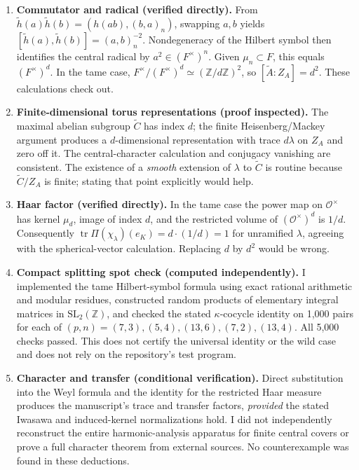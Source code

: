 \documentclass[12pt,letterpaper]{article}
\newcommand{\At}{\widetilde A}
\newcommand{\ZA}{Z_A}
\DeclareMathOperator{\tr}{tr}
\newcommand{\SL}{\mathrm{SL}}
\begin{document}
\begin{enumerate}[label=\textbf{C\arabic*.}]
\item \textbf{Commutator and radical (verified directly).} From $\widetilde h(a)\widetilde h(b)=(h(ab),(b,a)_n)$, swapping $a,b$ yields $[\widetilde h(a),\widetilde h(b)]=(a,b)_n^{-2}$. Nondegeneracy of the Hilbert symbol then identifies the central radical by $a^2\in(F^\times)^n$. Given $\mu_n\subset F$, this equals $(F^\times)^d$. In the tame case, $F^\times/(F^\times)^d\simeq(\mathbb Z/d\mathbb Z)^2$, so $[\At:\ZA]=d^2$. These calculations check out.
\item \textbf{Finite-dimensional torus representations (proof inspected).} The maximal abelian subgroup $\widetilde C$ has index $d$; the finite Heisenberg/Mackey argument produces a $d$-dimensional representation with trace $d\lambda$ on $\ZA$ and zero off it. The central-character calculation and conjugacy vanishing are consistent. The existence of a \emph{smooth} extension of $\lambda$ to $\widetilde C$ is routine because $\widetilde C/\ZA$ is finite; stating that point explicitly would help.
\item \textbf{Haar factor (verified directly).} In the tame case the power map on $\mathcal O^\times$ has kernel $\mu_d$, image of index $d$, and the restricted volume of $(\mathcal O^\times)^d$ is $1/d$. Consequently $\tr\Pi(\chi_\lambda)(e_K)=d\cdot(1/d)=1$ for unramified $\lambda$, agreeing with the spherical-vector calculation. Replacing $d$ by $d^2$ would be wrong.
\item \textbf{Compact splitting spot check (computed independently).} I implemented the tame Hilbert-symbol formula using exact rational arithmetic and modular residues, constructed random products of elementary integral matrices in $\SL_2(\mathbb Z)$, and checked the stated $\kappa$-cocycle identity on 1,000 pairs for each of $(p,n)=(7,3),(5,4),(13,6),(7,2),(13,4)$. All 5,000 checks passed. This does not certify the universal identity or the wild case and does not rely on the repository's test program.
\item \textbf{Character and transfer (conditional verification).} Direct substitution into the Weyl formula and the identity for the restricted Haar measure produces the manuscript's trace and transfer factors, \emph{provided} the stated Iwasawa and induced-kernel normalizations hold. I did not independently reconstruct the entire harmonic-analysis apparatus for finite central covers or prove a full character theorem from external sources. No counterexample was found in these deductions.
\end{enumerate}
\end{document}
